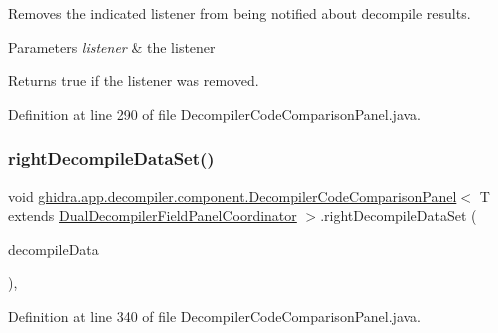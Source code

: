 Removes the indicated listener from being notified about decompile results. 
\begin{DoxyParams}{Parameters}
{\em listener} & the listener \\
\hline
\end{DoxyParams}
\begin{DoxyReturn}{Returns}
true if the listener was removed. 
\end{DoxyReturn}


Definition at line 290 of file Decompiler\+Code\+Comparison\+Panel.\+java.

\mbox{\label{classghidra_1_1app_1_1decompiler_1_1component_1_1_decompiler_code_comparison_panel_a0a0904fa33b0884b6f1cf69ab1477f7c}} 
\subsubsection{\texorpdfstring{rightDecompileDataSet()}{rightDecompileDataSet()}}
{\footnotesize\ttfamily void \mbox{\hyperlink{classghidra_1_1app_1_1decompiler_1_1component_1_1_decompiler_code_comparison_panel}{ghidra.\+app.\+decompiler.\+component.\+Decompiler\+Code\+Comparison\+Panel}}$<$ T extends \mbox{\hyperlink{classghidra_1_1app_1_1decompiler_1_1component_1_1_dual_decompiler_field_panel_coordinator}{Dual\+Decompiler\+Field\+Panel\+Coordinator}} $>$.right\+Decompile\+Data\+Set (\begin{DoxyParamCaption}\item[{\mbox{\hyperlink{classghidra_1_1app_1_1decompiler_1_1component_1_1_decompile_data}{Decompile\+Data}}}]{decompile\+Data }\end{DoxyParamCaption})\hspace{0.3cm}{\ttfamily [inline]}, {\ttfamily [protected]}}



Definition at line 340 of file Decompiler\+Code\+Comparison\+Panel.\+java.


